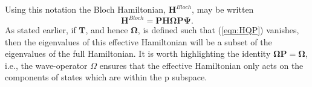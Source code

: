 Using this notation the Bloch Hamiltonian, $\mathbf{H}^{Bloch}$, may be written
\begin{equation}
\mathbf{H}^{Bloch} = \mathbf{P}\mathbf{H}\boldsymbol{\Omega}\mathbf{P}\mathbf{\Psi}.
\label{eqn:effective_Bloch}
\end{equation}
As stated earlier, if $\mathbf{T}$, and hence $\boldsymbol{\Omega}$, is defined such that (\ref{eqn:HQP}) vanishes,
then the eigenvalues of this effective Hamiltonian will be a subset of the eigenvalues of the full Hamiltonian. 
It is worth highlighting the identity $\boldsymbol{\Omega}\mathbf{P} = \boldsymbol{\Omega}$, i.e., 
the wave-operator $\Omega$ ensures that the effective Hamiltonian only acts on the components of states which are 
within the $\mathrm{p}$ subspace. \\

